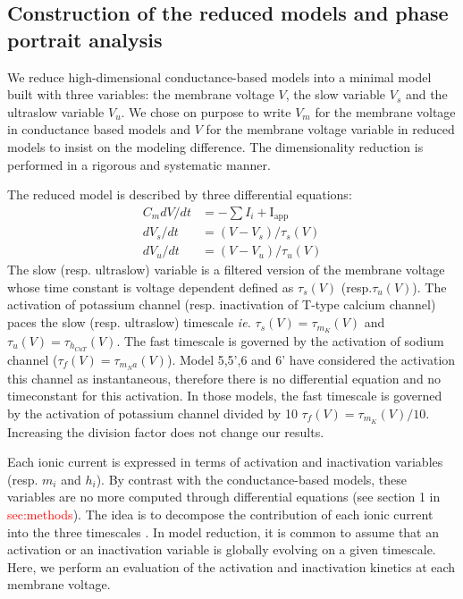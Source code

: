 \subsection{Construction of the reduced models and phase portrait analysis}
We reduce high-dimensional conductance-based models into a minimal model built with three variables: the membrane voltage $V$, the slow variable $V_s$ and the ultraslow variable $V_{u}$. We chose on purpose to write $V_m$ for the membrane voltage in conductance based models and $V$ for the membrane voltage variable in reduced models to insist on the modeling difference.  The dimensionality reduction is performed in a rigorous and systematic manner. 

The reduced model is described by three differential equations: 
\[
\begin{array}{rl}
	C_mdV/dt   &=   -\sum I_{i} + \text{I}_{\text{app}}\\
	dV_s/dt    &= (V - V_s)/\tau_s (V) \\
	dV_{u}/dt &= (V - V_{u})/\tau_u(V) 
\end{array}
\]
The slow (resp. ultraslow) variable is a filtered version of the membrane voltage whose time constant is voltage dependent defined as $\tau_s(V)$ (resp.$\tau_u(V)$). The activation of potassium channel (resp. inactivation of T-type calcium channel) paces the slow (resp. ultraslow) timescale \textit{ie.} $\tau_s(V)=\tau_{m_K}(V)$ and $\tau_u(V)=\tau_{h_{CaT}}(V)$. The fast timescale is governed by the activation of sodium channel ($\tau_f(V)=\tau_{m_Na}(V)$). Model 5,5',6 and 6' have considered the activation this channel as instantaneous, therefore there is no differential equation and no timeconstant for this activation. In those models, the fast timescale is governed by the activation of potassium channel divided by 10 $\tau_f(V)=\tau_{m_K}(V)/10$. Increasing the division factor does not change our results. 

 
Each ionic current is expressed in terms of activation and inactivation variables (resp. $m_i$ and $h_i$). By contrast with the conductance-based models, these variables are no more computed through differential equations (see section 1 in \textcolor{red}{sec:methods}). The idea is to decompose the contribution of each ionic current into the three timescales \citep{drion_dynamic_2015}.  In model reduction, it is common to assume that an activation or an inactivation variable is globally evolving on a given timescale. Here, we perform an evaluation of the activation and inactivation kinetics at each membrane voltage.

